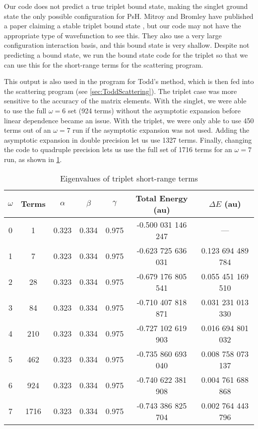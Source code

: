 \documentclass[Dissertation.tex]{subfiles}
\begin{document}
Our code does not predict a true triplet bound state, making the singlet ground state the only possible configuration for PsH. Mitroy and Bromley have published a paper claiming a stable triplet bound state \cite{Mitroy2007}, but our code may not have the appropriate type of wavefunction to see this. They also use a very large configuration interaction basis, and this bound state is very shallow. Despite not predicting a bound state, we run the bound state code for the triplet so that we can use this for the short-range terms for the scattering program.

This output is also used in the program for Todd's method, which is then fed into the scattering program (see \cref{sec:ToddScattering}). The triplet case was more sensitive to the accuracy of the matrix elements. With the singlet, we were able to use the full $\omega = 6$ set (924 terms) without the asymptotic expansion before linear dependence became an issue. With the triplet, we were only able to use 450 terms out of an $\omega = 7$ run if the asymptotic expansion was not used. Adding the asymptotic expansion in double precision let us use 1327 terms. Finally, changing the code to quadruple precision lets us use the full set of 1716 terms for an $\omega = 7$ run, as shown in \cref{tab:BoundEnergy3}. 

\setlength{\abovecaptionskip}{6pt}   %
\setlength{\belowcaptionskip}{6pt}   %
\begin{table}[H]
\centering
\begin{tabular}{c c c c c c c}
\toprule
$\omega$ & Terms & $\alpha$ & $\beta$ & $\gamma$ & Total Energy (au) & $\Delta E$ (au) \\ [0.5ex]
\midrule
0 & 1    & 0.323 & 0.334 & 0.975 & -0.500 031 146 247 & --- \\
1 & 7    & 0.323 & 0.334 & 0.975 & -0.623 725 636 031 & 0.123 694 489 784 \\
2 & 28   & 0.323 & 0.334 & 0.975 & -0.679 176 805 541 & 0.055 451 169 510 \\
3 & 84   & 0.323 & 0.334 & 0.975 & -0.710 407 818 871 & 0.031 231 013 330 \\
4 & 210  & 0.323 & 0.334 & 0.975 & -0.727 102 619 903 & 0.016 694 801 032 \\
5 & 462  & 0.323 & 0.334 & 0.975 & -0.735 860 693 040 & 0.008 758 073 137 \\
6 & 924  & 0.323 & 0.334 & 0.975 & -0.740 622 381 908 & 0.004 761 688 868 \\
7 & 1716 & 0.323 & 0.334 & 0.975 & -0.743 386 825 704 & 0.002 764 443 796 \\
\bottomrule
\end{tabular}
\caption{Eigenvalues of triplet short-range terms} %
\label{tab:BoundEnergy3}
\end{table}
\end{document}

